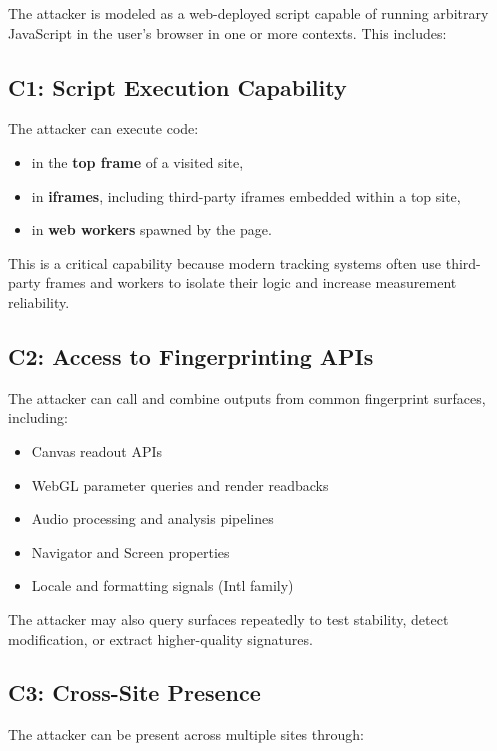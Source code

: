 \documentclass[11pt]{report}
\begin{document}
The attacker is modeled as a web-deployed script capable of running arbitrary JavaScript in the user’s browser in one or more contexts. This includes:

\subsection{C1: Script Execution Capability}

The attacker can execute code:

\begin{itemize}
    \item in the \textbf{top frame} of a visited site,
    \item in \textbf{iframes}, including third-party iframes embedded within a top site,
    \item in \textbf{web workers} spawned by the page.
\end{itemize}

This is a critical capability because modern tracking systems often use third-party frames and workers to isolate their logic and increase measurement reliability.

\subsection{C2: Access to Fingerprinting APIs}

The attacker can call and combine outputs from common fingerprint surfaces, including:

\begin{itemize}
    \item Canvas readout APIs
    \item WebGL parameter queries and render readbacks
    \item Audio processing and analysis pipelines
    \item Navigator and Screen properties
    \item Locale and formatting signals (Intl family)
\end{itemize}

The attacker may also query surfaces repeatedly to test stability, detect modification, or extract higher-quality signatures.

\subsection{C3: Cross-Site Presence}

The attacker can be present across multiple sites through:
\end{document}
